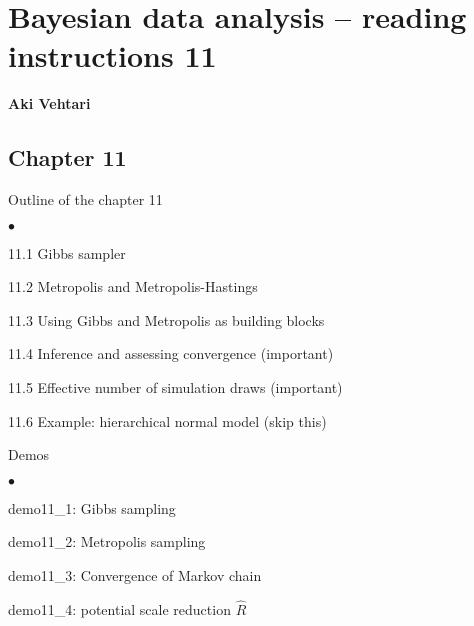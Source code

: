 \documentclass[a4paper,11pt,english]{article}
\begin{document}
\thispagestyle{empty}

\section*{Bayesian data analysis -- reading instructions 11} 
\smallskip
{\bf Aki Vehtari}
\smallskip

\subsection*{Chapter 11}

Outline of the chapter 11
\begin{list}{$\bullet$}{\parsep=0pt\itemsep=2pt}
\item 11.1 Gibbs sampler
\item 11.2 Metropolis and Metropolis-Hastings
\item 11.3 Using Gibbs and Metropolis as building blocks
\item 11.4 Inference and assessing convergence (important)
\item 11.5 Effective number of simulation draws (important)
\item 11.6 Example: hierarchical normal model (skip this)
\end{list}

Demos 
\begin{list}{$\bullet$}{\parsep=0pt\itemsep=2pt}
\item demo11\_1: Gibbs sampling
\item demo11\_2: Metropolis sampling
\item demo11\_3: Convergence of Markov chain
\item demo11\_4: potential scale reduction $\hat{R}$
\end{list}
\end{document}
